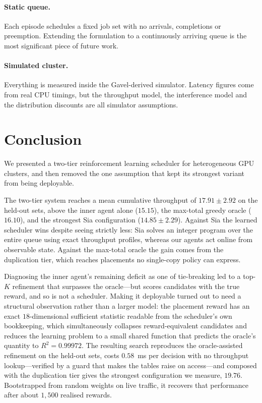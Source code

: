 \documentclass{article}
\begin{document}
\paragraph{Static queue.}
Each episode schedules a fixed job set with no arrivals, completions or
preemption. Extending the formulation to a continuously arriving queue is the most
significant piece of future work.

\paragraph{Simulated cluster.}
Everything is measured inside the Gavel-derived simulator. Latency figures come
from real CPU timings, but the throughput model, the interference model and the
distribution discounts are all simulator assumptions.

\section{Conclusion}

We presented a two-tier reinforcement learning scheduler for heterogeneous
GPU clusters, and then removed the one assumption that kept its strongest variant
from being deployable.

The two-tier system reaches a mean cumulative throughput of $17.91 \pm 2.92$ on the
held-out sets, above the inner agent alone ($15.15$), the max-total greedy oracle
($16.10$), and the strongest Sia configuration ($14.85 \pm 2.29$). Against Sia the
learned scheduler wins despite seeing strictly less: Sia solves an integer program
over the entire queue using exact throughput profiles, whereas our agents act
online from observable state. Against the max-total oracle the gain comes from the
duplication tier, which reaches placements no single-copy policy can express.

Diagnosing the inner agent's remaining deficit as one of tie-breaking led to a
top-$K$ refinement that surpasses the oracle---but scores candidates with the true
reward, and so is not a scheduler. Making it deployable turned out to need a
structural observation rather than a larger model: the placement reward has an
exact $18$-dimensional sufficient statistic readable from the scheduler's own
bookkeeping, which simultaneously collapses reward-equivalent candidates and
reduces the learning problem to a small shared function that predicts the oracle's
quantity to $R^2 = 0.99972$. The resulting search reproduces the oracle-assisted
refinement on the held-out sets, costs $0.58$~ms per decision with no throughput
lookup---verified by a guard that makes the tables raise on access---and composed
with the duplication tier gives the strongest configuration we measure, $19.76$. Bootstrapped from random weights on live traffic, it
recovers that performance after about $1{,}500$ realised rewards.
\end{document}
